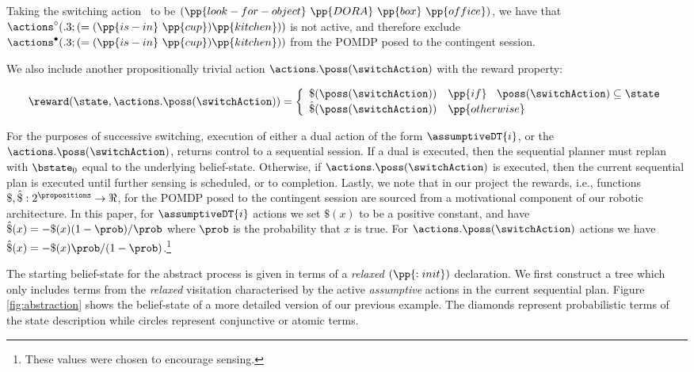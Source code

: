 \documentclass{article}
\begin{document}
\noindent Taking the switching action \switchAction\ to be
$(\pp{look-for-object}~\pp{DORA}~\pp{box}~\pp{office})$, we have that
$\actions^{\circ}(.3;(=(\pp{is-in}~\pp{cup})\pp{kitchen}))$ is not
active, and therefore exclude
$\actions^{\bullet}(.3;(=(\pp{is-in}~\pp{cup})\pp{kitchen}))$ from the
POMDP posed to the contingent session. 

We also include another propositionally trivial action
$\actions.\poss(\switchAction)$ with the reward property:

\[
\reward(\state, \actions.\poss(\switchAction)) = \bigg\{ \begin{array}{ll}
\$(\poss(\switchAction)) & \pp{if}~\;\; \poss(\switchAction) \subseteq \state \\
\hat\$(\poss(\switchAction)) & \pp{otherwise} \\
\end{array}
\]

For the purposes of successive switching, execution of either a dual
action of the form $\assumptiveDT{i}$, or the
$\actions.\poss(\switchAction)$, returns control to a sequential
session. If a dual is executed, then the sequential planner must
replan with $\bstate_0$ equal to the underlying
belief-state. Otherwise, if $\actions.\poss(\switchAction)$ is
executed, then the current sequential plan is executed until further
sensing is scheduled, or to completion. Lastly, we note that in our
project the rewards, i.e., functions
$\$,\hat\$:2^\propositions\to\Re$, for the POMDP posed to the
contingent session are sourced from a motivational component of our
robotic architecture. In this paper, for $\assumptiveDT{i}$ actions we
set $\$(x)$ to be a positive constant, and have $\hat\$(x)= - \$(x)(1
- \prob) / \prob$ where $\prob$ is the probability that $x$ is true. For
$\actions.\poss(\switchAction)$ actions we have $\hat\$(x)= -
\$(x)\prob/(1-\prob)$.\footnote{These values were chosen to encourage
  sensing.}


The starting belief-state for the abstract process is given in terms
of a {\em relaxed} $(\pp{:init})$ declaration. We first construct a
tree which only includes terms from the {\em relaxed} visitation
characterised by the active {\em assumptive} actions in the current
sequential plan. Figure \ref{fig:abstraction} shows the belief-state
of a more detailed version of our previous example. The diamonds
represent probabilistic terms of the state description while circles
represent conjunctive or atomic terms. 
\end{document}
